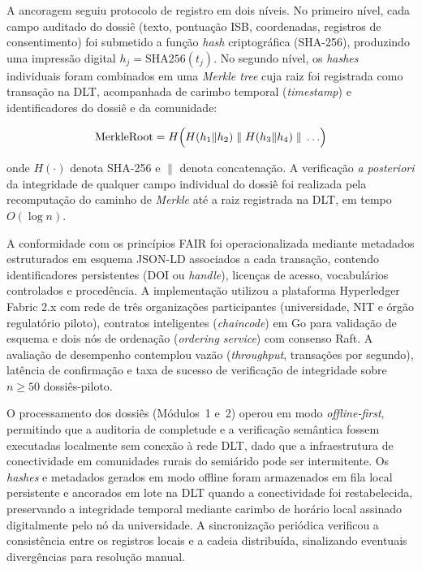 \documentclass[preprint,12pt,authoryear]{elsarticle}
\begin{document}
A ancoragem seguiu protocolo de registro em dois níveis. No primeiro nível, cada campo auditado do dossiê (texto, pontuação ISB, coordenadas, registros de consentimento) foi submetido a função \textit{hash} criptográfica (SHA-256), produzindo uma impressão digital $h_j = \text{SHA256}(t_j)$. No segundo nível, os \textit{hashes} individuais foram combinados em uma \textit{Merkle tree} cuja raiz foi registrada como transação na DLT, acompanhada de carimbo temporal (\textit{timestamp}) e identificadores do dossiê e da comunidade:

\begin{equation}
\text{MerkleRoot} = H\Bigl(H(h_1 \| h_2) \;\|\; H(h_3 \| h_4) \;\|\; \ldots\Bigr)
\label{eq:merkle_cap5}
\end{equation}

\noindent onde $H(\cdot)$ denota SHA-256 e $\|$ denota concatenação. A verificação \textit{a posteriori} da integridade de qualquer campo individual do dossiê foi realizada pela recomputação do caminho de \textit{Merkle} até a raiz registrada na DLT, em tempo $O(\log n)$.

A conformidade com os princípios FAIR \citep{Wilkinson2016} foi operacionalizada mediante metadados estruturados em esquema JSON-LD associados a cada transação, contendo identificadores persistentes (DOI ou \textit{handle}), licenças de acesso, vocabulários controlados e procedência. A implementação utilizou a plataforma Hyperledger Fabric 2.x \citep{Hyperledger2020} com rede de três organizações participantes (universidade, NIT e órgão regulatório piloto), contratos inteligentes (\textit{chaincode}) em Go para validação de esquema e dois nós de ordenação (\textit{ordering service}) com consenso Raft. A avaliação de desempenho contemplou vazão (\textit{throughput}, transações por segundo), latência de confirmação e taxa de sucesso de verificação de integridade sobre $n \geq 50$ dossiês-piloto.

O processamento dos dossiês (Módulos~1 e~2) operou em modo \textit{offline-first}, permitindo que a auditoria de completude e a verificação semântica fossem executadas localmente sem conexão à rede DLT, dado que a infraestrutura de conectividade em comunidades rurais do semiárido pode ser intermitente. Os \textit{hashes} e metadados gerados em modo offline foram armazenados em fila local persistente e ancorados em lote na DLT quando a conectividade foi restabelecida, preservando a integridade temporal mediante carimbo de horário local assinado digitalmente pelo nó da universidade. A sincronização periódica verificou a consistência entre os registros locais e a cadeia distribuída, sinalizando eventuais divergências para resolução manual.
\end{document}
